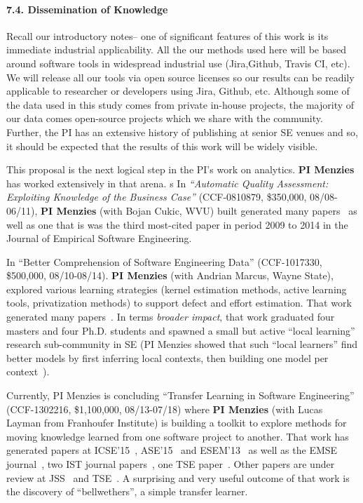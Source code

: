 \paragraph{7.4. Dissemination of Knowledge}
Recall our introductory notes-- one of significant features of this work is its
immediate industrial applicability.
All the our methods used here will be based around software tools in widespread industrial use (Jira,Github, Travis CI, etc).  We will release all our tools via open source licenses so our results can be readily applicable to researcher or developers using Jira, Github, etc.
Although some of the data used in this study comes from private in-house projects,
the majority of our data comes open-source projects which we share with the community.
Further, the PI has an extensive history of publishing at senior SE venues and so, it should be expected
that the results of this work will be widely visible.


This proposal is the next logical step in the PI's work on analytics.
{\bf PI Menzies} has worked extensively in that arena.
s
In
\emph{``Automatic
Quality Assessment: Exploiting Knowledge of the Business Case''} (CCF-0810879, \$350,000, 08/08-06/11),
{\bf PI Menzies} (with Bojan Cukic, WVU) built   generated many papers~\cite{jiang08a,me09n,me09i,me09b,me10d}
as well as one that is  was the third most-cited
paper in period 2009 to 2014 in the Journal of Empirical Software
Engineering.

In ``Better Comprehension of Software Engineering Data'' (CCF-1017330, \$500,000, 08/10-08/14).
{\bf PI Menzies} (with Andrian Marcus, Wayne State),
explored various learning strategies (kernel estimation
methods, active learning tools, privatization methods) to
support defect and effort estimation. That work generated many papers~\cite{Bavota2010,Bavota2012a,Bavota2013,Bavota2012b,Haiduc2010a, Haiduc2013a, Haiduc2012a, Haiduc2013b, Marcus2010b, Ohlemacher2011b, Scanniello2013, Scanniello2011,me11m, peters12,Me13,me13a,peters12a}.
In terms \emph{broader impact}, that work graduated four masters and four Ph.D. students
and
spawned a small but active ``local learning'' research sub-community in SE (PI Menzies showed that
such ``local learners'' find better models
by first inferring local contexts, then building one model per context~\cite{Me13,me11m}).

Currently, PI Menzies is concluding
``Transfer Learning in Software Engineering'' (CCF-1302216, \$1,100,000, 08/13-07/18)
where {\bf PI Menzies} (with Lucas Layman from Franhoufer Institute) is
building a toolkit to explore  methods for moving knowledge
learned from one software project to another.  That work  has generated
papers at ICSE'15~\cite{PetersML15}, ASE'15~\cite{krishna16}  and ESEM'13~\cite{he13} as well as the EMSE journal~\cite{Me17}, two IST journal papers~\cite{fu2016tuning,krishna2017learning},
one TSE paper~\cite{nam2017heterogeneous}. Other papers are under review at JSS~\cite{rees2017better}
and TSE~\cite{krishna2017simpler}. A surprising and very useful outcome of that work
is the discovery of ``bellwethers'',  a simple transfer learner.

